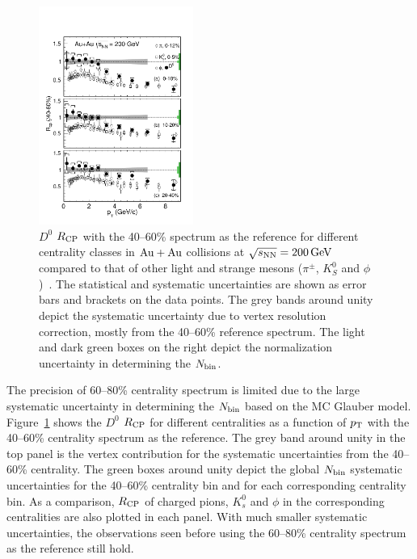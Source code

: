 \documentclass[%
 reprint,	
 amsmath,amssymb,
 aps,
 prc,
]{revtex4-1}
\begin{document}
\begin{figure}
\centering
\includegraphics[width=0.45\textwidth]{fig/D0_Rcp2.pdf}
\caption{$D^{0}$ $R_{\rm CP}$ with the 40--60\% spectrum as the reference for different centrality classes in ${\rm{Au + Au}}$ collisions at ${\sqrt{s_{\rm NN}} = \rm{200\,GeV}}$ compared to that of other light and strange mesons ($\pi^{\pm}$, $K^0_{S}$ and $\phi$)~\cite{Adams2006_Identified,Abelev2009,Agakishiev2012}. The statistical and systematic uncertainties are shown as error bars and brackets on the data points. The grey bands around unity depict the systematic uncertainty due to vertex resolution correction, mostly from the 40--60\% reference spectrum. The light and dark green boxes on the right depict the normalization uncertainty in determining the $N_{\rm bin}$.}
\label{fig:D0_Rcp2} 
\end{figure}

The precision of 60--80\% centrality spectrum is limited due to the large systematic uncertainty in determining the $N_{\rm bin}$ based on the MC Glauber model. Figure~\ref{fig:D0_Rcp2} shows the $D^0$ $R_{\rm CP}$ for different centralities as a function of $p_{\rm T}$ with the 40--60\% centrality spectrum as the reference. The grey band around unity in the top panel is the vertex contribution for the systematic uncertainties from the 40--60\% centrality. The green boxes around unity depict the global $N_{\rm bin}$ systematic uncertainties for the 40--60\% centrality bin and for each corresponding centrality bin. As a comparison, $R_{\rm CP}$ of charged pions, $K_{s}^{0}$ and $\phi$ in the corresponding centralities are also plotted in each panel. With much smaller systematic uncertainties, the observations seen before using the 60--80\% centrality spectrum as the reference still hold. 
\end{document}
